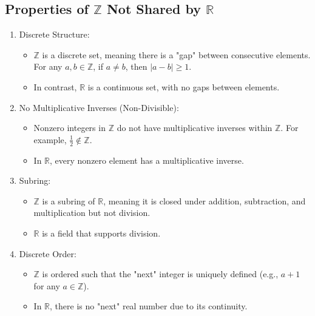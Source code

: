 \subsection{Properties of \( \mathbb{Z} \) Not Shared by \( \mathbb{R} \)}
\begin{enumerate}[topsep=0pt]
    \item Discrete Structure:
        \begin{itemize}
            \item \( \mathbb{Z} \) is a discrete set, meaning there is a "gap" between consecutive elements. For any \( a, b \in \mathbb{Z} \), if \( a \neq b \), then \( |a - b| \geq 1 \).
            \item In contrast, \( \mathbb{R} \) is a continuous set, with no gaps between elements.
        \end{itemize}
        
    \item No Multiplicative Inverses (Non-Divisible):
        \begin{itemize}
            \item Nonzero integers in \( \mathbb{Z} \) do not have multiplicative inverses within \( \mathbb{Z} \). For example, \( \frac{1}{2} \notin \mathbb{Z} \).
            \item In \( \mathbb{R} \), every nonzero element has a multiplicative inverse.
        \end{itemize}

    \item Subring:
     \begin{itemize}
        \item \( \mathbb{Z} \) is a subring of \( \mathbb{R} \), meaning it is closed under addition, subtraction, and multiplication but not division.
        \item \( \mathbb{R} \) is a field that supports division.
    \end{itemize}

    \item Discrete Order:
     \begin{itemize}
        \item \( \mathbb{Z} \) is ordered such that the "next" integer is uniquely defined (e.g., \( a+1 \) for any \( a \in \mathbb{Z} \)).
        \item In \( \mathbb{R} \), there is no "next" real number due to its continuity.
    \end{itemize}


\end{enumerate}
